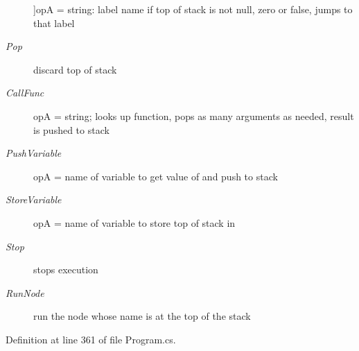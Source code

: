 \begin{Desc}
\begin{description}
{}]op\-A = string\-: label name if top of stack is not null, zero or false, jumps to that label \item[{\em 
\hypertarget{a00051_ad5dfb6ee68ca7469623ad3e459f98894a0ae61bd0474e04c9f1195d4baa0213a0}{Pop}\label{a00051_ad5dfb6ee68ca7469623ad3e459f98894a0ae61bd0474e04c9f1195d4baa0213a0}
}]discard top of stack \item[{\em 
\hypertarget{a00051_ad5dfb6ee68ca7469623ad3e459f98894a3b5e7e8300dc6e4b78cb865c5b10f01a}{Call\-Func}\label{a00051_ad5dfb6ee68ca7469623ad3e459f98894a3b5e7e8300dc6e4b78cb865c5b10f01a}
}]op\-A = string; looks up function, pops as many arguments as needed, result is pushed to stack \item[{\em 
\hypertarget{a00051_ad5dfb6ee68ca7469623ad3e459f98894ab8c46f65015a178516fadbb5ad6c2038}{Push\-Variable}\label{a00051_ad5dfb6ee68ca7469623ad3e459f98894ab8c46f65015a178516fadbb5ad6c2038}
}]op\-A = name of variable to get value of and push to stack \item[{\em 
\hypertarget{a00051_ad5dfb6ee68ca7469623ad3e459f98894a872dc050abaff4beb46e70dadd4088c2}{Store\-Variable}\label{a00051_ad5dfb6ee68ca7469623ad3e459f98894a872dc050abaff4beb46e70dadd4088c2}
}]op\-A = name of variable to store top of stack in \item[{\em 
\hypertarget{a00051_ad5dfb6ee68ca7469623ad3e459f98894a11a755d598c0c417f9a36758c3da7481}{Stop}\label{a00051_ad5dfb6ee68ca7469623ad3e459f98894a11a755d598c0c417f9a36758c3da7481}
}]stops execution \item[{\em 
\hypertarget{a00051_ad5dfb6ee68ca7469623ad3e459f98894ae956bcf888278c168ee9b106927ff6ac}{Run\-Node}\label{a00051_ad5dfb6ee68ca7469623ad3e459f98894ae956bcf888278c168ee9b106927ff6ac}
}]run the node whose name is at the top of the stack \end{description}
\end{Desc}


Definition at line 361 of file Program.\-cs.


